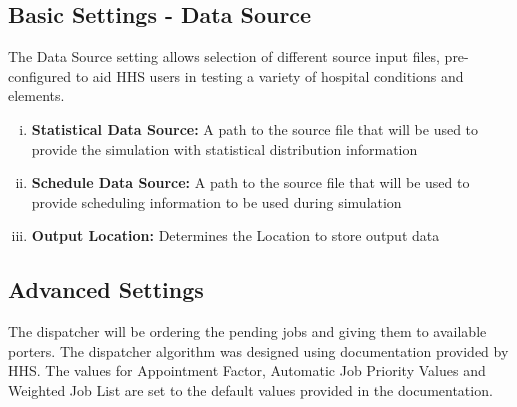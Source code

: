 \documentclass[paper=letter, fontsize=10pt]{scrartcl}
\numberwithin{equation}{section}		%
\numberwithin{figure}{section}			%
\numberwithin{table}{section}				%
\begin{document}
	\subsection{Basic Settings - Data Source}
	The Data Source setting allows selection of different source input files, pre-configured to aid HHS users in testing a variety of hospital conditions and elements. 
	\begin{enumerate}[(i)]
		\item \textbf{Statistical Data Source:} A path to the source file that will be used to provide the simulation with statistical distribution information
		\item \textbf{Schedule Data Source:} A path to the source file that will be used to provide scheduling information to be used during simulation
		\item \textbf{Output Location:} Determines the Location to store output data
	\end{enumerate}
	
	\subsection{Advanced Settings}
	The dispatcher will be ordering the pending jobs and giving them to available porters.  The dispatcher algorithm was designed using documentation provided by HHS.  The values for Appointment Factor, Automatic Job Priority Values and Weighted Job List are set to the default values provided in the documentation.
	
\end{document}

